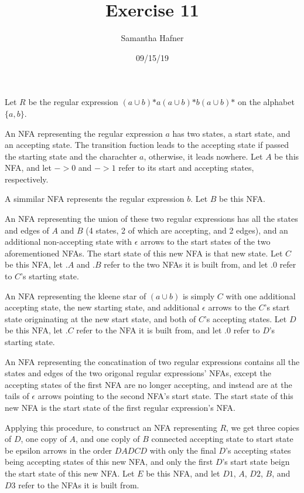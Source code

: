 \documentclass[12pt]{article}
\title{Exercise 11}
\author{Samantha Hafner}
\date{09/15/19}
\begin{document}
\maketitle

Let $R$ be the regular expression $(a{\cup}b)\mbox{*}a(a{\cup}b)\mbox{*}b(a{\cup}b)\mbox{*}$ on the alphabet $\{a, b\}$.

An NFA representing the regular expression $a$ has two states, a start state, and an accepting state. The transition fuction leads to the accepting state if passed the starting state and the charachter $a$, otherwise, it leads nowhere. Let $A$ be this NFA, and let $->0$ and $->1$ refer to its start and accepting states, respectively.

A simmilar NFA represents the regular expression $b$. Let $B$ be this NFA.

An NFA representing the union of these two regular expressions has all the states and edges of $A$ and $B$ (4 states, 2 of which are accepting, and 2 edges), and an additional non-accepting state with $\epsilon$ arrows to the start states of the two aforementioned NFAs. The start state of this new NFA is that new state. Let $C$ be this NFA, let $.A$ and $.B$ refer to the two NFAs it is built from, and let $.0$ refer to $C$'s starting state.

An NFA representing the kleene star of $(a{\cup}b)$ is simply $C$ with one additional accepting state, the new starting state, and additional $\epsilon$ arrows to the $C$'s start state origninating at the new start state, and both of $C$'s accepting states. Let $D$ be this NFA, let $.C$ refer to the NFA it is built from, and let $.0$ refer to $D$'s starting state.

An NFA representing the concatination of two regular expressions contains all the states and edges of the two origonal regular expressions' NFAs, except the accepting states of the first NFA are no longer accepting, and instead are at the tails of $\epsilon$ arrows pointing to the second NFA's start state. The start state of this new NFA is the start state of the first regular expression's NFA.

Applying this procedure, to construct an NFA representing $R$, we get three copies of $D$, one copy of $A$, and one coply of $B$ connected accepting state to start state be epsilon arrows in the order $DADCD$ with only the final $D$'s accepting states being accepting states of this new NFA, and only the first $D$'s start state beign the start state of this new NFA. Let $E$ be this NFA, and let $D1$, $A$, $D2$, $B$, and $D3$ refer to the NFAs it is built from.
\end{document}
